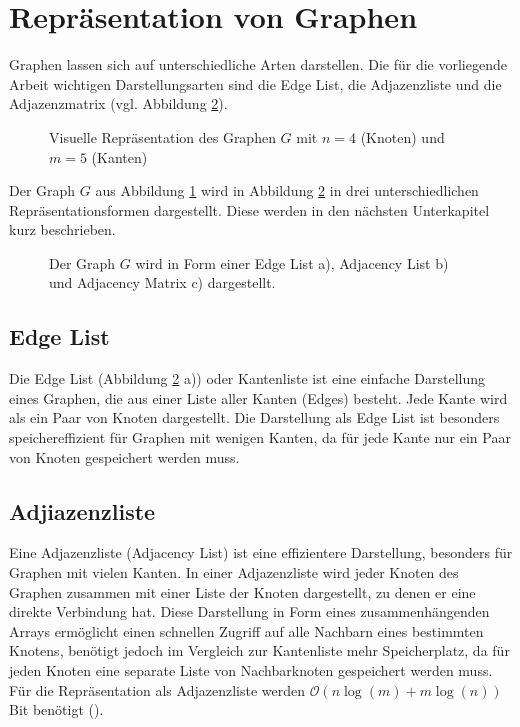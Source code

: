 \documentclass{ffhsthesis}
\begin{document}
\section{Repräsentation von Graphen} %
\label{ch:represent}
Graphen lassen sich auf unterschiedliche Arten darstellen. Die für die vorliegende Arbeit wichtigen Darstellungsarten sind die Edge List, die Adjazenzliste und die Adjazenzmatrix (vgl. Abbildung \ref{fig:visual-graph}). 

\begin{figure}[h]
    \centering
    
    \caption{Visuelle Repräsentation des Graphen $G$ mit $n=4$ (Knoten) und $m=5$ (Kanten)}
    \label{fig:graph-g}
\end{figure}
Der Graph $G$ aus Abbildung \ref{fig:graph-g} wird in Abbildung \ref{fig:visual-graph} in drei unterschiedlichen Repräsentationsformen dargestellt. Diese werden in den nächsten Unterkapitel kurz beschrieben.
\begin{figure}[h]
    \centering
    
    \caption{Der Graph $G$ wird in Form einer Edge List a), Adjacency List b) und Adjacency Matrix c) dargestellt.}
    \label{fig:visual-graph}
\end{figure}
\subsection{Edge List}
Die Edge List (Abbildung \ref{fig:visual-graph} a)) oder Kantenliste ist eine einfache Darstellung eines Graphen, die aus einer Liste aller Kanten (Edges) besteht. Jede Kante wird als ein Paar von Knoten dargestellt. Die Darstellung als Edge List ist besonders speichereffizient für Graphen mit wenigen Kanten, da für jede Kante nur ein Paar von Knoten gespeichert werden muss.
\subsection{Adjiazenzliste}
Eine Adjazenzliste (Adjacency List) ist eine effizientere Darstellung, besonders für Graphen mit vielen Kanten. In einer Adjazenzliste wird jeder Knoten des Graphen zusammen mit einer Liste der Knoten dargestellt, zu denen er eine direkte Verbindung hat. Diese Darstellung in Form eines zusammenhängenden Arrays ermöglicht einen schnellen Zugriff auf alle Nachbarn eines bestimmten Knotens, benötigt jedoch im Vergleich zur Kantenliste mehr Speicherplatz, da für jeden Knoten eine separate Liste von Nachbarknoten gespeichert werden muss. Für die Repräsentation als Adjazenzliste werden $\mathcal{O}(n \log(m) +m \log(n))$ Bit benötigt (\cite{besta2018survey}).
\end{document}
